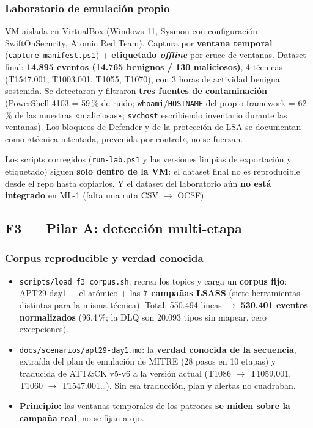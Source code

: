 \documentclass[11pt,a4paper]{article}
\newcommand{\cod}[1]{\texttt{#1}}
\newcommand{\flecha}{$\rightarrow$}
\begin{document}
\subsubsection*{Laboratorio de emulación propio}
VM aislada en VirtualBox (Windows 11, Sysmon con configuración SwiftOnSecurity, Atomic Red Team). Captura por
\textbf{ventana temporal} (\cod{capture-manifest.ps1}) + \textbf{etiquetado \textit{offline}} por cruce de ventanas.
Dataset final: \textbf{14.895 eventos (14.765 benignos / 130 maliciosos)}, 4 técnicas (T1547.001, T1003.001,
T1055, T1070), con 3 horas de actividad benigna sostenida. Se detectaron y filtraron \textbf{tres fuentes de
contaminación} (PowerShell 4103 = 59\,\% de ruido; \cod{whoami}/\cod{HOSTNAME} del propio framework = 62\,\%
de las muestras «maliciosas»; \cod{svchost} escribiendo inventario durante las ventanas). Los bloqueos de
Defender y de la protección de LSA se documentan como «técnica intentada, prevenida por control», no se fuerzan.

\begin{ojo}
Los scripts corregidos (\cod{run-lab.ps1} y las versiones limpias de exportación y etiquetado) siguen
\textbf{solo dentro de la VM}: el dataset final no es reproducible desde el repo hasta copiarlos. Y el dataset
del laboratorio aún \textbf{no está integrado} en ML-1 (falta una ruta CSV \flecha{} OCSF).
\end{ojo}

\subsection{F3 — Pilar A: detección multi-etapa}\label{sec:f3}

\subsubsection*{Corpus reproducible y verdad conocida}
\begin{itemize}
  \item \cod{scripts/load\_f3\_corpus.sh}: recrea los topics y carga un \textbf{corpus fijo}: APT29 day1 + el
        atómico + las \textbf{7 campañas LSASS} (siete herramientas distintas para la misma técnica). Total:
        550.494 líneas \flecha{} \textbf{530.401 eventos normalizados} (96,4\,\%; la DLQ son 20.093 tipos sin mapear,
        cero excepciones).
  \item \cod{docs/scenarios/apt29-day1.md}: la \textbf{verdad conocida de la secuencia}, extraída del plan de
        emulación de MITRE (28 pasos en 10 etapas) y traducida de ATT\&CK v5-v6 a la versión actual
        (T1086 \flecha{} T1059.001, T1060 \flecha{} T1547.001\ldots). Sin esa traducción, plan y alertas no cuadraban.
  \item \textbf{Principio:} las ventanas temporales de los patrones \textbf{se miden sobre la campaña real},
        no se fijan a ojo.
\end{itemize}
\end{document}
